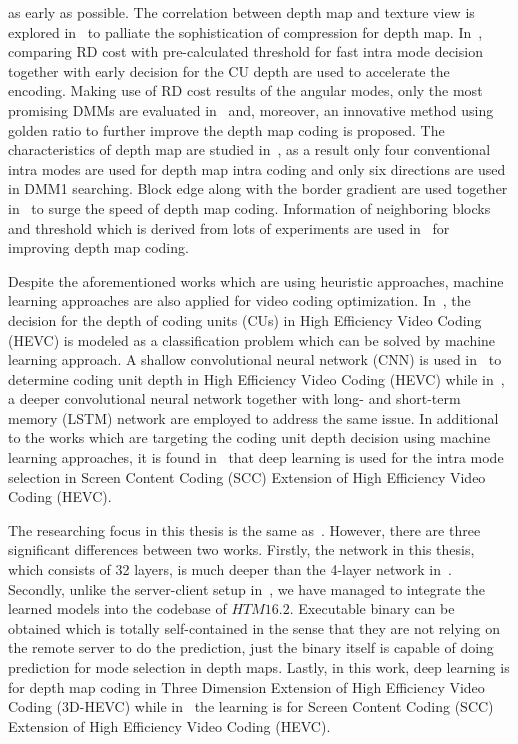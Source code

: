 as early as possible.
The correlation between depth map and texture view is explored
in~\parencite{RN94} to palliate the sophistication of
compression for depth map.
In~\parencite{RN212}, comparing RD cost with pre-calculated threshold for fast
intra mode decision together with early decision for the CU depth are used
to accelerate the encoding.
Making use of RD cost results of the angular modes, only the most promising
DMMs are evaluated in~\parencite{RN87} and, moreover, an innovative
method using golden ratio to further improve the
depth map coding is proposed.
The characteristics of depth map are studied in~\parencite{RN91},
as a result only four conventional intra modes are used for
depth map intra coding and only six directions are used in DMM1 searching.
Block edge along with the border gradient are used together
in~\parencite{RN114} to surge the speed of depth map coding.
Information of neighboring blocks and threshold which is derived from
lots of experiments are used in~\parencite{RN85} for improving depth
map coding.

Despite the aforementioned works which are using heuristic approaches,
machine learning approaches are also applied for video coding optimization.
In~\parencite{RN74}, the decision for the depth of coding units (CUs)
in High Efficiency Video Coding (HEVC) is modeled as a classification
problem which can be solved by machine learning approach.
A shallow convolutional neural network (CNN) is
used in~\parencite{RN78} to determine coding unit depth in
High Efficiency Video Coding (HEVC) while
in~\parencite{DBLP:journals-corr-abs-1710-01218}, a deeper convolutional
neural network together with long- and short-term memory (LSTM) network
are employed to address the same issue.
In additional to the works which are targeting the
coding unit depth decision using machine learning approaches, it is found
in~\parencite{RN73} that deep learning is used for the intra mode
selection in Screen Content Coding (SCC)
Extension of High Efficiency Video Coding (HEVC).

The researching focus in this thesis is the same as~\parencite{RN73}.
However, there are three significant differences between two works.
Firstly, the network in this thesis, which consists of 32 layers, is
much deeper than the 4-layer network in~\parencite{RN73}.
Secondly, unlike the server-client setup in~\parencite{RN73}, we have
managed to integrate the learned models into the codebase of \(HTM16.2\).
Executable binary can be obtained which is totally self-contained in the
sense that they are not relying on the remote server to do the prediction,
just the binary itself is capable of doing prediction
for mode selection in depth maps.
Lastly, in this work, deep learning is for depth map coding in
Three Dimension Extension of High Efficiency Video Coding (3D-HEVC)
while in~\parencite{RN73} the learning is for Screen Content Coding (SCC)
Extension of High Efficiency Video Coding (HEVC).
